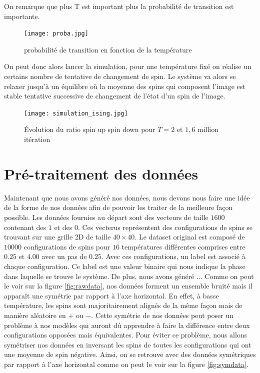 \documentclass[11pt, parskip=half]{scrartcl} %
\begin{document}
 On remarque que plus T est important plus la probabilité de transition est importante.

\begin{figure}[h]
	\centering
	\texttt{[image: proba.jpg]}
	\caption{probabilité de transition en fonction de la température}
	\label{fig:H}
\end{figure}

On peut donc alors lancer la simulation, pour une température fixé on réalise un certains nombre de tentative de changement de spin. Le système va alors se relaxer jusqu'à un équilibre où la moyenne des spins qui composent l'image est stable tentative successive de changement de l'état d'un spin de l'image.

\begin{figure}[h]
	\centering
	\texttt{[image: simulation\_ising.jpg]}
	\caption{Évolution du ratio spin up spin down pour $T=2$ et $1,6$ million itération }
	\label{fig:H}
\end{figure}


\section{Pré-traitement des données}
Maintenant que nous avons généré nos données, nous devons nous faire une idée de la forme de nos données afin de pouvoir les traiter de la meilleure façon possible.
Les données fournies au départ sont des vecteurs de taille $1600$ contenant des $1$ et des $0$. Ces vecterus représentent des configurations de spins se trouvant sur une grille 2D de taille $40 \times 40$. Le dataset original est composé de $10000$ configurations de spins pour $16$ températures différentes comprises entre $0.25$ et $4.00$ avec un pas de $0.25$.
Avec ces configurations, un label est associé à chaque configuration. Ce label est une valeur binaire qui nous indique la phase dans laquelle se trouve le système. 
De plus, nous avons généré ...
Comme on peut le voir sur la figure \ref{fig:rawdata}, nos données forment un ensemble bruité mais il apparaît une symétrie par rapport à l'axe horizontal. En effet, à basse température, les spins sont majoritairement alignés de la même façon mais de manière aléatoire en $+$ ou $-$.
Cette symétrie de nos données peut poser un problème à nos modèles qui auront dû apprendre à faire la différence entre deux configurations opposées mais équivalentes. Pour éviter ce problème, nous allons symétriser nos données en inversant les spins de toutes les configurations qui ont une moyenne de spin  négative. 
Ainsi, on se retrouve avec des données symétriques par rapport à l'axe horizontal comme on peut le voir sur la figure \ref{fig:symdata}.
\end{document}
